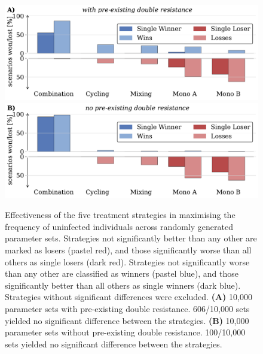 \documentclass[9pt,twocolumn,twoside,lineno]{pnas-new}
\begin{document}
    \begin{figure}[h]
        \centering
        \includegraphics[width = \linewidth]{wins_and_losses_preexisting.pdf}
        \includegraphics[width = \linewidth]{wins_and_losses_no_preex.pdf}
        \captionsetup{skip=0pt}
          \caption{
                Effectiveness of the five treatment strategies in maximising the frequency of uninfected individuals across randomly generated parameter sets.
                Strategies not significantly better than any other are marked as losers (pastel red), and those significantly worse than all others as single losers (dark red). 
                Strategies not significantly worse than any other are classified as winners (pastel blue), and those significantly better than all others as single winners (dark blue). 
                Strategies without significant differences were excluded.
                \textbf{(A)} 10,000 parameter sets with pre-existing double resistance. 606/10,000 sets yielded no significant difference between the strategies.
                \textbf{(B)} 10,000 parameter sets without pre-existing double resistance. 100/10,000 sets yielded no significant difference between the strategies.
                }
        \label{fig:senstivity_analysis}
    \end{figure}
    
\end{document}
